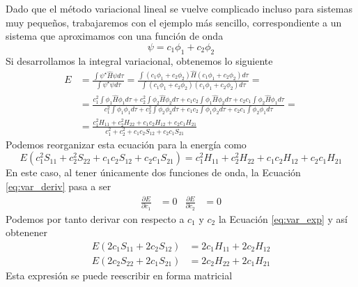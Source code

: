 Dado que el método variacional lineal se vuelve complicado
incluso para sistemas muy pequeños, trabajaremos con el ejemplo
más sencillo, correspondiente a un sistema que aproximamos
con una función de onda 
\begin{equation}
    \psi=c_1\phi_1 + c_2\phi_2
\end{equation}
Si desarrollamos la integral variacional, obtenemos lo siguiente
\begin{equation}
\begin{split}
    E&=\frac{\int\psi^\star\hat{H}\psi d\tau}{\int\psi^\star\psi d\tau}  
    = \frac{\int( c_1\phi_1+ c_2\phi_2)\hat{H}(c_1\phi_1+ c_2\phi_2)d\tau}{\int (c_1\phi_1+ c_2\phi_2)(c_1\phi_1+ c_2\phi_2)d\tau}=\\
    &= \frac{c_1^2\int\phi_1\hat{H}\phi_1 d\tau +
    c_2^2\int\phi_2\hat{H}\phi_2 d\tau +
    c_1c_2\int\phi_1\hat{H}\phi_2 d\tau +
    c_2c_1\int\phi_2\hat{H}\phi_1 d\tau}
    {c_1^2\int\phi_1\phi_1 d\tau +
    c_2^2\int\phi_2\phi_2 d\tau +
    c_1c_2\int\phi_1\phi_2 d\tau +
    c_2c_1\int\phi_2\phi_1 d\tau} =\\
    & = \frac{c_1^2H_{11} + c_2^2H_{22} + c_1c_2H_{12} + c_2c_1H_{21}}{c_1^2 + c_2^2 + c_1c_2S_{12} + c_2c_1S_{21}}
    \end{split}
\end{equation}
Podemos reorganizar esta ecuación para la energía como
\begin{equation}
    E({c_1^2S_{11} + c_2^2S_{22} + c_1c_2S_{12} + c_2c_1S_{21}})=c_1^2H_{11} + c_2^2H_{22} + c_1c_2H_{12} + c_2c_1H_{21}
    \label{eq:var_exp}
\end{equation}
En este caso, al tener únicamente dos funciones de onda, 
la Ecuación \ref{eq:var_deriv} pasa a ser
\begin{align}
    \frac{\partial E}{\partial c_1}&=0       & \frac{\partial E}{\partial c_2}&=0
\end{align}
Podemos por tanto derivar con respecto a $c_1$ y $c_2$
la Ecuación \ref{eq:var_exp} y así obtenener
\begin{align}
 E(2c_1S_{11} +2c_2S_{12})    &=2c_1H_{11} +2c_2H_{12} \\
 E(2c_2S_{22} +2c_1S_{21})    &=2c_2H_{22} +2c_1H_{21} 
\end{align}
Esta expresión se puede reescribir en forma matricial
